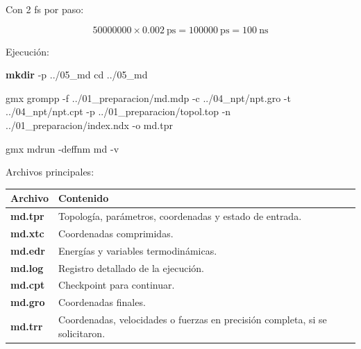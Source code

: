 \documentclass[
  spanish,
  11pt,
  a4paper]{article}
\newenvironment{Shaded}{\begin{snugshade}}{\end{snugshade}}
\newcommand{\AttributeTok}[1]{\textcolor[rgb]{0.13,0.29,0.53}{#1}}
\newcommand{\BuiltInTok}[1]{#1}
\newcommand{\ExtensionTok}[1]{#1}
\newcommand{\FunctionTok}[1]{\textcolor[rgb]{0.13,0.29,0.53}{\textbf{#1}}}
\newcommand{\NormalTok}[1]{#1}
\newcounter{none} %
\begin{document}
Con 2 fs por paso:

\[
50000000\times 0.002\ \mathrm{ps}
=100000\ \mathrm{ps}
=100\ \mathrm{ns}
\]

Ejecución:

\begin{Shaded}
\begin{Highlighting}[]
\FunctionTok{mkdir} \AttributeTok{{-}p}\NormalTok{ ../05\_md}
\BuiltInTok{cd}\NormalTok{ ../05\_md}

\ExtensionTok{gmx}\NormalTok{ grompp     }\AttributeTok{{-}f}\NormalTok{ ../01\_preparacion/md.mdp     }\AttributeTok{{-}c}\NormalTok{ ../04\_npt/npt.gro     }\AttributeTok{{-}t}\NormalTok{ ../04\_npt/npt.cpt     }\AttributeTok{{-}p}\NormalTok{ ../01\_preparacion/topol.top     }\AttributeTok{{-}n}\NormalTok{ ../01\_preparacion/index.ndx     }\AttributeTok{{-}o}\NormalTok{ md.tpr}

\ExtensionTok{gmx}\NormalTok{ mdrun }\AttributeTok{{-}deffnm}\NormalTok{ md }\AttributeTok{{-}v}
\end{Highlighting}
\end{Shaded}

Archivos principales:

{\def\LTcaptype{none} %
\begin{longtable}[]{@{}
  >{\raggedright\arraybackslash}p{}
  >{\raggedright\arraybackslash}p{}@{}}
\toprule\noalign{}
\begin{minipage}[b]{\linewidth}\raggedright
Archivo
\end{minipage} & \begin{minipage}[b]{\linewidth}\raggedright
Contenido
\end{minipage} \\
\midrule\noalign{}
\endhead
\bottomrule\noalign{}
\endlastfoot
\textbf{md.tpr} & Topología, parámetros, coordenadas y estado de
entrada. \\
\textbf{md.xtc} & Coordenadas comprimidas. \\
\textbf{md.edr} & Energías y variables termodinámicas. \\
\textbf{md.log} & Registro detallado de la ejecución. \\
\textbf{md.cpt} & Checkpoint para continuar. \\
\textbf{md.gro} & Coordenadas finales. \\
\textbf{md.trr} & Coordenadas, velocidades o fuerzas en precisión
completa, si se solicitaron. \\
\end{longtable}
}
\end{document}
